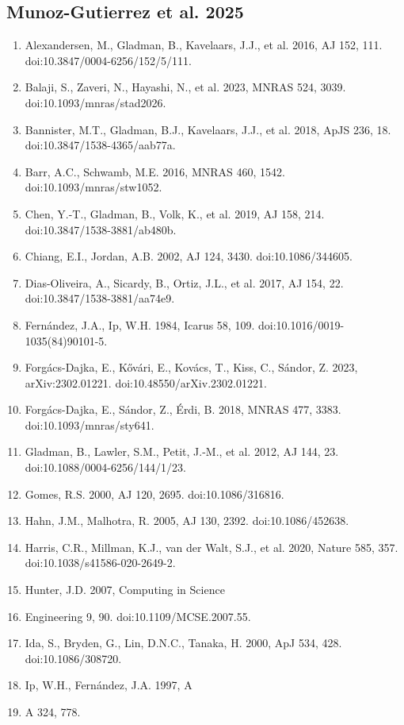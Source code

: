 \documentclass[12pt]{article}
\begin{document}
\subsection*{Munoz-Gutierrez et al. 2025}
\begin{enumerate}
\item Alexandersen, M., Gladman, B., Kavelaars, J.J., et al. 2016, AJ 152, 111. doi:10.3847/0004-6256/152/5/111.
\item Balaji, S., Zaveri, N., Hayashi, N., et al. 2023, MNRAS 524, 3039. doi:10.1093/mnras/stad2026.
\item Bannister, M.T., Gladman, B.J., Kavelaars, J.J., et al. 2018, ApJS 236, 18. doi:10.3847/1538-4365/aab77a.
\item Barr, A.C., Schwamb, M.E. 2016, MNRAS 460, 1542. doi:10.1093/mnras/stw1052.
\item Chen, Y.-T., Gladman, B., Volk, K., et al. 2019, AJ 158, 214. doi:10.3847/1538-3881/ab480b.
\item Chiang, E.I., Jordan, A.B. 2002, AJ 124, 3430. doi:10.1086/344605.
\item Dias-Oliveira, A., Sicardy, B., Ortiz, J.L., et al. 2017, AJ 154, 22. doi:10.3847/1538-3881/aa74e9.
\item Fernández, J.A., Ip, W.H. 1984, Icarus 58, 109. doi:10.1016/0019-1035(84)90101-5.
\item Forgács-Dajka, E., Kővári, E., Kovács, T., Kiss, C., Sándor, Z. 2023, arXiv:2302.01221. doi:10.48550/arXiv.2302.01221.
\item Forgács-Dajka, E., Sándor, Z., Érdi, B. 2018, MNRAS 477, 3383. doi:10.1093/mnras/sty641.
\item Gladman, B., Lawler, S.M., Petit, J.-M., et al. 2012, AJ 144, 23. doi:10.1088/0004-6256/144/1/23.
\item Gomes, R.S. 2000, AJ 120, 2695. doi:10.1086/316816.
\item Hahn, J.M., Malhotra, R. 2005, AJ 130, 2392. doi:10.1086/452638.
\item Harris, C.R., Millman, K.J., van der Walt, S.J., et al. 2020, Nature 585, 357. doi:10.1038/s41586-020-2649-2.
\item Hunter, J.D. 2007, Computing in Science
\item Engineering 9, 90. doi:10.1109/MCSE.2007.55.
\item Ida, S., Bryden, G., Lin, D.N.C., Tanaka, H. 2000, ApJ 534, 428. doi:10.1086/308720.
\item Ip, W.H., Fernández, J.A. 1997, A
\item A 324, 778.

\end{enumerate}
\end{document}

